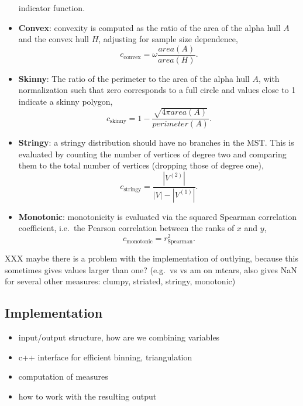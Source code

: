 \begin{itemize}
  indicator function.
\item
  \textbf{Convex}: convexity is computed as the ratio of the area of the
  alpha hull \(A\) and the convex hull \(H\), adjusting for sample size
  dependence, \begin{equation}
  c_{\mathrm{convex}} = \omega \frac{area(A)}{area(H)}.
  \end{equation}
\item
  \textbf{Skinny}: The ratio of the perimeter to the area of the alpha
  hull \(A\), with normalization such that zero corresponds to a full
  circle and values close to 1 indicate a skinny polygon,
  \begin{equation}
  c_{\mathrm{skinny}} = 1 -  \frac{\sqrt{4\pi area(A)}}{perimeter(A)}.
  \end{equation}
\item
  \textbf{Stringy}: a stringy distribution should have no branches in
  the MST. This is evaluated by counting the number of vertices of
  degree two and comparing them to the total number of vertices
  (dropping those of degree one), \begin{equation}
  c_{\mathrm{stringy}} = \frac{|V^{(2)}|}{|V| - |V^{(1)}|}.
  \end{equation}
\item
  \textbf{Monotonic}: monotonicity is evaluated via the squared Spearman
  correlation coefficient, i.e.~the Pearson correlation between the
  ranks of \(x\) and \(y\), \begin{equation}
  c_{\mathrm{monotonic}} = r_{\mathrm{Spearman}}^2.
  \end{equation}
\end{itemize}

XXX maybe there is a problem with the implementation of outlying,
because this sometimes gives values larger than one? (e.g.~vs vs am on
mtcars, also gives NaN for several other measures: clumpy, striated,
stringy, monotonic)

\hypertarget{implementation}{%
\subsection{Implementation}\label{implementation}}

\begin{itemize}
\tightlist
\item
  input/output structure, how are we combining variables
\item
  c++ interface for efficient binning, triangulation
\item
  computation of measures
\item
  how to work with the resulting output
\end{itemize}


